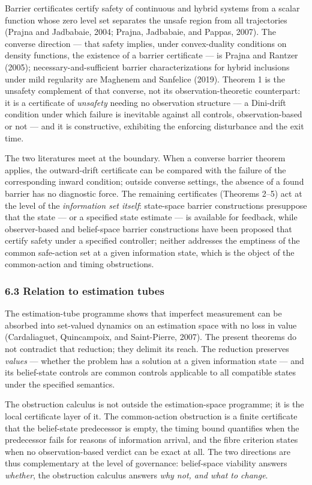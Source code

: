 \documentclass[11pt]{article}
\begin{document}
Barrier certificates certify safety of continuous and hybrid systems
from a scalar function whose zero level set separates the unsafe region
from all trajectories (Prajna and Jadbabaie, 2004; Prajna, Jadbabaie,
and Pappas, 2007). The converse direction --- that safety implies, under
convex-duality conditions on density functions, the existence of a
barrier certificate --- is Prajna and Rantzer (2005);
necessary-and-sufficient barrier characterizations for hybrid inclusions
under mild regularity are Maghenem and Sanfelice (2019). Theorem 1 is
the unsafety complement of that converse, not its observation-theoretic
counterpart: it is a certificate of \emph{unsafety} needing no
observation structure --- a Dini-drift condition under which failure is
inevitable against all controls, observation-based or not --- and it is
constructive, exhibiting the enforcing disturbance and the exit time.

The two literatures meet at the boundary. When a converse barrier
theorem applies, the outward-drift certificate can be compared with the
failure of the corresponding inward condition; outside converse
settings, the absence of a found barrier has no diagnostic force. The remaining certificates
(Theorems 2--5) act at the level of the \emph{information set itself}:
state-space barrier constructions presuppose that the state --- or a
specified state estimate --- is available for feedback, while observer-based and belief-space barrier constructions have been proposed that certify safety under a specified controller; neither addresses the emptiness of
the common safe-action set at a given information state, which is the
object of the common-action and timing obstructions.

\subsubsection{6.3 Relation to estimation
tubes}\label{relation-to-estimation-tubes}

The estimation-tube programme shows that imperfect measurement can be
absorbed into set-valued dynamics on an estimation space with no loss in
value (Cardaliaguet, Quincampoix, and Saint-Pierre, 2007). The present
theorems do not contradict that reduction; they delimit its reach. The
reduction preserves \emph{values} --- whether the problem has a solution
at a given information state --- and its belief-state controls are common controls applicable to all compatible states under the specified semantics.

The obstruction calculus is not outside the estimation-space programme;
it is the local certificate layer of it. The common-action obstruction
is a finite certificate that the belief-state predecessor is empty, the
timing bound quantifies when the predecessor fails for reasons of
information arrival, and the fibre criterion states when no
observation-based verdict can be exact at all. The two directions are
thus complementary at the level of governance: belief-space viability
answers \emph{whether}, the obstruction calculus answers \emph{why not,
and what to change}.
\end{document}
